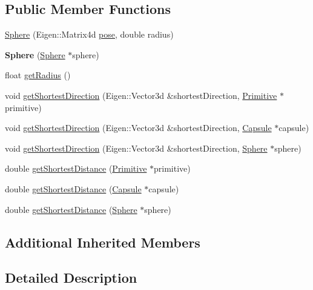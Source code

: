\subsection*{Public Member Functions}
\begin{DoxyCompactItemize}
\item 
\hyperlink{class_sphere_a7a9a9cfc01f619bb8cda60ae907d6372}{Sphere} (Eigen\+::\+Matrix4d \hyperlink{class_primitive_ad8b2afbad412f6046783d155c88fe312}{pose}, double radius)
\item 
{\bfseries Sphere} (\hyperlink{class_sphere}{Sphere} $\ast$sphere)\hypertarget{class_sphere_a564eb09ed988535e33c2b2e701d80581}{}\label{class_sphere_a564eb09ed988535e33c2b2e701d80581}

\item 
float \hyperlink{class_sphere_a330dd34c7c7b6dfff106c4c71ec80028}{get\+Radius} ()
\item 
void \hyperlink{class_sphere_a707fc14e03a6ff67ac012a18b2a8cb28}{get\+Shortest\+Direction} (Eigen\+::\+Vector3d \&shortest\+Direction, \hyperlink{class_primitive}{Primitive} $\ast$primitive)
\item 
void \hyperlink{class_sphere_af7ff30023363261cf118d1fb80c745a7}{get\+Shortest\+Direction} (Eigen\+::\+Vector3d \&shortest\+Direction, \hyperlink{class_capsule}{Capsule} $\ast$capsule)
\item 
void \hyperlink{class_sphere_a719592bc6a8307060f49f289da631310}{get\+Shortest\+Direction} (Eigen\+::\+Vector3d \&shortest\+Direction, \hyperlink{class_sphere}{Sphere} $\ast$sphere)
\item 
double \hyperlink{class_sphere_a7330816427e4099f4a8ccb8c34bd9ec6}{get\+Shortest\+Distance} (\hyperlink{class_primitive}{Primitive} $\ast$primitive)
\item 
double \hyperlink{class_sphere_a2b078585c4b272e9286eac12189b885b}{get\+Shortest\+Distance} (\hyperlink{class_capsule}{Capsule} $\ast$capsule)
\item 
double \hyperlink{class_sphere_a6efb9b513c9b42a7b040969b802727ea}{get\+Shortest\+Distance} (\hyperlink{class_sphere}{Sphere} $\ast$sphere)
\end{DoxyCompactItemize}
\subsection*{Additional Inherited Members}


\subsection{Detailed Description}


